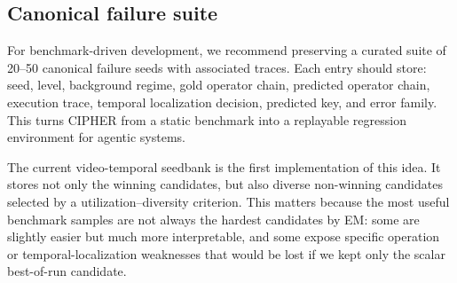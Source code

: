 \subsection{Canonical failure suite}

For benchmark-driven development, we recommend preserving a curated suite of
20--50 canonical failure seeds with associated traces. Each entry should store:
seed, level, background regime, gold operator chain, predicted operator chain,
execution trace, temporal localization decision, predicted key, and error
family. This turns CIPHER from a static benchmark into a replayable regression
environment for agentic systems.

The current video-temporal seedbank is the first implementation of this idea.
It stores not only the winning candidates, but also diverse non-winning
candidates selected by a utilization--diversity criterion. This matters because
the most useful benchmark samples are not always the hardest candidates by EM:
some are slightly easier but much more interpretable, and some expose specific
operation or temporal-localization weaknesses that would be lost if we kept
only the scalar best-of-run candidate.
